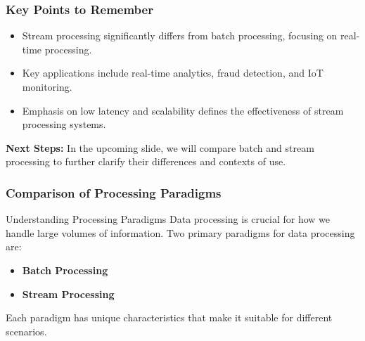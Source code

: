 \documentclass[aspectratio=169]{beamer}
\begin{document}
\begin{frame}[fragile]
    \frametitle{Key Points to Remember}
    \begin{itemize}
        \item Stream processing significantly differs from batch processing, focusing on real-time processing.
        \item Key applications include real-time analytics, fraud detection, and IoT monitoring.
        \item Emphasis on low latency and scalability defines the effectiveness of stream processing systems.
    \end{itemize}

    \textbf{Next Steps:} In the upcoming slide, we will compare batch and stream processing to further clarify their differences and contexts of use.
\end{frame}

\begin{frame}[fragile]
    \frametitle{Comparison of Processing Paradigms}
    \begin{block}{Understanding Processing Paradigms}
        Data processing is crucial for how we handle large volumes of information. Two primary paradigms for data processing are:
        \begin{itemize}
            \item \textbf{Batch Processing}
            \item \textbf{Stream Processing}
        \end{itemize}
        Each paradigm has unique characteristics that make it suitable for different scenarios.
    \end{block}
\end{frame}
\end{document}
